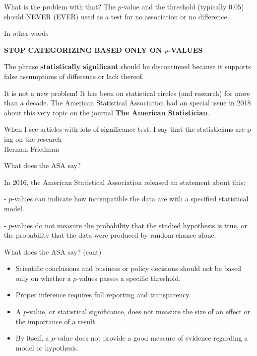 \documentclass{beamer}
\begin{document}
\begin{frame}{What is the problem with that?}
The $p$-value and the threshold (typically $0.05$) should NEVER (EVER) used as a test for no association or no difference. 

In other words 

\begin{displayquote}
\textbf{STOP CATEGORIZING BASED ONLY ON $p$-VALUES}
\end{displayquote}

The phrase \textbf{statistically significant} should be discontinued because it supports false assumptions of difference or lack thereof. 
\end{frame}

\begin{frame}{It is not a new problem!}
It has been on statistical circles (and research) for more than a decade. 
The American Statistical Association had an special issue in 2018 about this very topic on the journal \textbf{The American Statistician}.

\begin{displayquote}
When I see articles with lots of significance test, I say that the statisticians are p-ing on the research\\
Herman Friedman
\end{displayquote}

\end{frame}

\begin{frame}{What does the ASA say?}

In 2016, the American Statistical Association released an statement about this:

- $p$-values can indicate how incompatible the data are with a specified statistical model.

- $p$-values do not measure the probability that the studied hypothesis is true, or the probability that the data were produced by random chance alone.

\end{frame}

\begin{frame}{What does the ASA say? (cont)}
	
	\begin{itemize}
		\item Scientific conclusions and business or policy decisions should not be based only on whether a $p$-values passes a specific threshold.
		\item Proper inference requires full reporting and transparency.
		\item A $p$-value, or statistical significance, does not measure the size of an effect or the importance of a result.
		\item  By itself, a $p$-value does not provide a good measure of evidence regarding a model or hypothesis.
	\end{itemize}

\end{frame}
\end{document}
